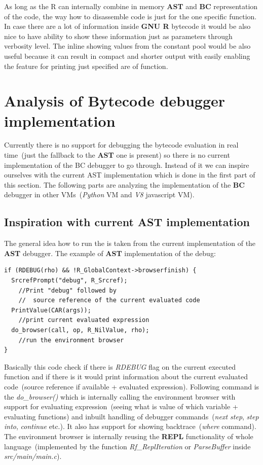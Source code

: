 \documentclass[thesis=M,english]{FITthesis}[2018/10/20]
\begin{document}
As long as the R can internally combine in memory \textbf{AST} and \textbf{BC} representation of the code, the way how to disassemble code is just for the one specific function. In case there are a lot of information inside \textbf{GNU R} bytecode it would be also nice to have ability to show these information just as parameters through verbosity level. The inline showing values from the constant pool would be also useful because it can result in compact and shorter output with easily enabling the feature for printing just specified are of function.

\section{Analysis of Bytecode debugger implementation}

Currently there is no support for debugging the bytecode evaluation in real time~(just the fallback to the \textbf{AST} one is present) so there is no current implementation of the BC debugger to go through. Instead of it we can inspire ourselves with the current AST implementation which is done in the first part of this section. The following parts are analyzing the implementation of the \textbf{BC} debugger in other VMs~(\textit{Python} VM and \textit{V8} javascript VM).

\subsection{Inspiration with current AST implementation}
The general idea how to run the is taken from the current implementation of the \textbf{AST} debugger. The example of \textbf{AST} implementation of the debug:
\begin{lstlisting}
if (RDEBUG(rho) && !R_GlobalContext->browserfinish) {
  SrcrefPrompt("debug", R_Srcref);
    //Print "debug" followed by
    //  source reference of the current evaluated code
  PrintValue(CAR(args));
  	//print current evaluated expression
  do_browser(call, op, R_NilValue, rho);
  	//run the environment browser
}
\end{lstlisting}
Basically this code check if there is \textit{RDEBUG} flag on the current executed function and if there is it would print information about the current evaluated code~(source reference if available + evaluated expression). Following command is the \textit{do{\_}browser()} which is internally calling the environment browser with support for evaluating expression~(seeing what is value of which variable + evaluating functions) and inbuilt handling of debugger commands~(\textit{next step}, \textit{step into}, \textit{continue} etc.). It also has support for showing backtrace~(\textit{where} command). The environment browser is internally reusing the \textbf{REPL} functionality of whole language~(implemented by the function \textit{Rf{\_}ReplIteration} or \textit{ParseBuffer} inside \textit{src/main/main.c}).
\end{document}

